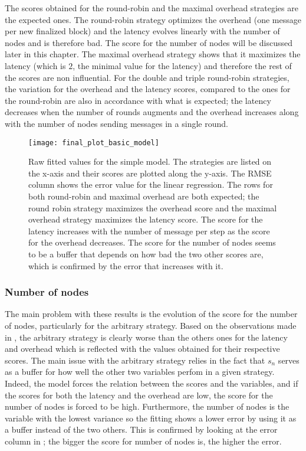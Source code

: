The scores obtained for the round-robin and the maximal overhead strategies are
the expected ones. The round-robin strategy optimizes the overhead (one message
per new finalized block) and the latency evolves linearly with the number of
nodes and is therefore bad. The score for the number of nodes will be discussed
later in this chapter. The maximal overhead strategy shows that it maximizes the
latency (which is \(2\), the minimal value for the latency) and therefore the
rest of the scores are non influential.
For the double and triple round-robin strategies, the variation for the overhead
and the latency scores, compared to the ones for the round-robin are also in
accordance with what is expected; the latency decreases when the number of
rounds augments and the overhead increases along with the number of nodes
sending messages in a single round.

\begin{figure}[h]
    \centering
    \texttt{[image: final\_plot\_basic\_model]}
    \caption{Raw fitted values for the simple model. The strategies are listed
    on the x-axis and their scores are plotted along the y-axis. The RMSE column shows the error value for the linear
        regression. The rows for both round-robin and maximal overhead are both
        expected; the round robin strategy maximizes the overhead score and the
        maximal overhead strategy maximizes the latency score. The score for the
        latency increases with the number of message per step as the score for
        the overhead decreases. The score for the number of nodes seems to be a
        buffer that depends on how bad the two other scores are, which is
        confirmed by the error that increases with it.
    }
    \label{fig:recapTestsPlot}
\end{figure}

\subsubsection{Number of nodes}
\label{ssec:nbNodes}
The main problem with these results is the evolution of the score for the number
of nodes, particularly for the arbitrary strategy. Based on the observations
made in , the arbitrary strategy is clearly worse than the
others ones for the latency and overhead which is reflected with the values
obtained for their respective scores. The main issue with the arbitrary strategy
relies in the fact that \(s_n\) serves as a buffer for how well the other two
variables perfom in a given strategy.  Indeed, the model forces the relation
between the scores and the variables, and if the scores for both the latency and
the overhead are low, the score for the number of nodes is forced to be high.
Furthermore, the number of nodes is the variable with the lowest variance so the
fitting shows a lower error by using it as a buffer instead of the two others.
This is confirmed by looking at the error column in ; the
bigger the score for number of nodes is, the higher the error. 

